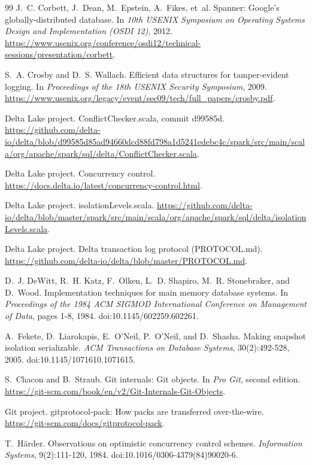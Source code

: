 \documentclass[11pt,letterpaper]{article}
\theoremstyle{definition}
\theoremstyle{remark}
\begin{document}
\begin{thebibliography}{99}
J.~C. Corbett, J.~Dean, M.~Epstein, A.~Fikes, et~al.
Spanner: Google's globally-distributed database.
In \emph{10th USENIX Symposium on Operating Systems Design and Implementation (OSDI 12)}, 2012.
\url{https://www.usenix.org/conference/osdi12/technical-sessions/presentation/corbett}.

S.~A. Crosby and D.~S. Wallach.
Efficient data structures for tamper-evident logging.
In \emph{Proceedings of the 18th USENIX Security Symposium}, 2009.
\url{https://www.usenix.org/legacy/event/sec09/tech/full_papers/crosby.pdf}.

Delta Lake project.
ConflictChecker.scala, commit d99585d.
\url{https://github.com/delta-io/delta/blob/d99585d85ad94660dcd88fd798a1d5241edebc4c/spark/src/main/scala/org/apache/spark/sql/delta/ConflictChecker.scala}.

Delta Lake project.
Concurrency control.
\url{https://docs.delta.io/latest/concurrency-control.html}.

Delta Lake project.
isolationLevels.scala.
\url{https://github.com/delta-io/delta/blob/master/spark/src/main/scala/org/apache/spark/sql/delta/isolationLevels.scala}.

Delta Lake project.
Delta transaction log protocol (PROTOCOL.md).
\url{https://github.com/delta-io/delta/blob/master/PROTOCOL.md}.

D.~J. DeWitt, R.~H. Katz, F.~Olken, L.~D. Shapiro, M.~R. Stonebraker, and D.~Wood.
Implementation techniques for main memory database systems.
In \emph{Proceedings of the 1984 ACM SIGMOD International Conference on Management of Data}, pages 1-8, 1984.
doi:10.1145/602259.602261.

A.~Fekete, D.~Liarokapis, E.~O'Neil, P.~O'Neil, and D.~Shasha.
Making snapshot isolation serializable.
\emph{ACM Transactions on Database Systems}, 30(2):492-528, 2005.
doi:10.1145/1071610.1071615.

S.~Chacon and B.~Straub.
Git internals: Git objects.
In \emph{Pro Git}, second edition.
\url{https://git-scm.com/book/en/v2/Git-Internals-Git-Objects}.

Git project.
gitprotocol-pack: How packs are transferred over-the-wire.
\url{https://git-scm.com/docs/gitprotocol-pack}.

T.~H{\"a}rder.
Observations on optimistic concurrency control schemes.
\emph{Information Systems}, 9(2):111-120, 1984.
doi:10.1016/0306-4379(84)90020-6.


\end{thebibliography}
\end{document}
